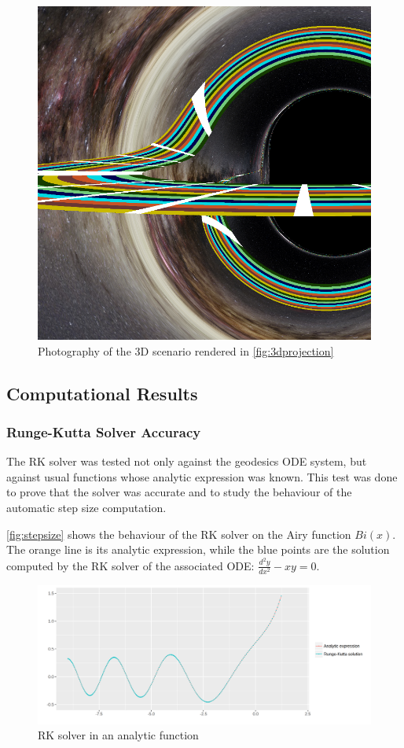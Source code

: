 \begin{figure}[bth]
	\myfloatalign
	\includegraphics[width=.5\linewidth]{gfx/3d_01_image}
	\caption[Photography from a 3D scenario]{Photography of the 3D scenario rendered in \autoref{fig:3dprojection}}
	\label{fig:3dprojectionimage}
\end{figure}

\subsection{Computational Results}

\subsubsection*{Runge-Kutta Solver Accuracy}

The \ac{RK} solver was tested not only against the geodesics \ac{ODE} system, but against usual functions whose analytic expression was known. This test was done to prove that the solver was accurate and to study the behaviour of the automatic step size computation.

\autoref{fig:stepsize} shows the behaviour of the \ac{RK} solver on the Airy function $Bi(x)$. The orange line is its analytic expression, while the blue points are the solution computed by the \ac{RK} solver of the associated \ac{ODE}: $\frac{d^2y}{dx^2} - xy = 0$.

\begin{figure}[bth]
	\myfloatalign
	\includegraphics[trim={4cm 0 12cm 5cm},clip,width=.5\linewidth]{gfx/analytic}
	\caption[Solver in an analytic function]{\ac{RK} solver in an analytic function}
	\label{fig:stepsize}
\end{figure}

